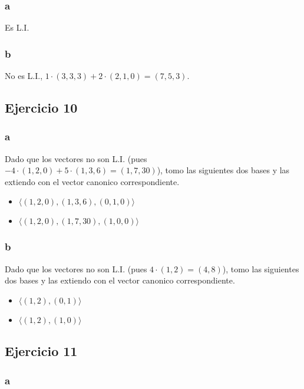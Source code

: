 \documentclass{article}
\begin{document}
\subsubsection*{a}

Es L.I.

\subsubsection*{b}

No es L.I., $1\cdot(3,3,3) + 2\cdot(2,1,0) = (7,5,3)$.

\subsection*{Ejercicio 10}

\subsubsection*{a}

Dado que los vectores no son L.I. (pues $-4\cdot(1,2,0)+ 5\cdot(1,3,6) = (1,7,30)$), 
tomo las siguientes dos bases y las extiendo con el vector canonico correspondiente.
\begin{itemize}
    \item $\langle (1,2,0), (1,3,6), (0,1,0) \rangle$
    \item $\langle (1,2,0), (1,7,30), (1,0,0) \rangle$
\end{itemize}

\subsubsection*{b}

Dado que los vectores no son L.I. (pues $4\cdot(1,2) = (4,8)$), 
tomo las siguientes dos bases y las extiendo con el vector canonico correspondiente.
\begin{itemize}
    \item $\langle (1,2), (0,1) \rangle$
    \item $\langle (1,2), (1,0) \rangle$
\end{itemize}

\subsection*{Ejercicio 11}

\subsubsection*{a}
\end{document}
